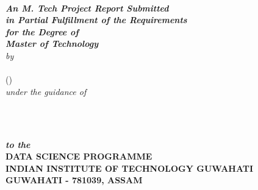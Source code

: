 \begin{titlepage}
\begin{center}
\textheight 15.5in \textwidth 12.5in {\large\sf  \textbf{\the\btptitle}}\\[12ex]
{\small{\textsl{ \textbf{An M. Tech Project Report Submitted \\
in Partial Fulfillment of the Requirements \\
for the Degree of
\\[3ex]\small \bf Master of Technology}}}}\\[16ex] \emph{by} \\[2ex]
{\sf \sf \textbf{\the\name}\\
             (\the\rollno)}\\[1ex]
\emph{under the guidance of}\\[2ex]
{\sf \bf \the\guide} \\[7ex]

\vspace{1.2in}

 \begin{figure}[!h]
 \hfill
  \hfill \
 \end{figure}

{\sl \bf{to the}} \\[1ex]

{\small\bf DATA SCIENCE PROGRAMME}  \\[1ex]
{\small \bf{INDIAN INSTITUTE OF TECHNOLOGY GUWAHATI \\GUWAHATI - 781039, ASSAM}}
%
\end{center}
\end{titlepage}
